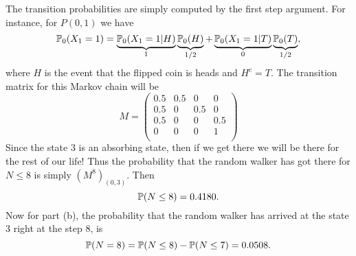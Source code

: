 \begin{example}
\begin{solution}
\begin{center}
\begin{tikzpicture}[->,>=stealth',shorten >=1pt,auto,node distance=2.1cm,
				semithick,scale=0.7]
			\end{tikzpicture}
		\end{center}
	The transition probabilities are simply computed by the first step argument. For instance, for $P(0,1)$ we have
	\[ \prob_0(X_1 = 1) = \underbrace{\prob_0(X_1 = 1|H)}_{1}\underbrace{\prob_0(H)}_{1/2} + \underbrace{\prob_0(X_1 = 1|T)}_{0}\underbrace{\prob_0(T)}_{1/2}, \]
	where $H$ is the event that the flipped coin is heads and $H^c = T$. The transition matrix for this Markov chain will be
	\[
	M = \begin{pmatrix}
		0.5 & 0.5 & 0 & 0 \\
		0.5 & 0 & 0.5 & 0 \\
		0.5 & 0 & 0 & 0.5 \\
		0 & 0 & 0 & 1 \\
	\end{pmatrix}
	\]
	Since the state $3$ is an absorbing state, then if we get there we will be there for the rest of our life! Thus the probability that the random walker has got there for $N\leq 8$ is simply $(M^8)_{(0,3)}$. Then
	\[ \prob(N\leq 8) = 0.4180. \]
	Now for part (b), the probability that the random walker has arrived at the state 3 right at the step 8, is
	\[ \prob(N = 8) = \prob(N\leq 8) - \prob(N\leq 7) = 0.0508. \]
	\end{solution}
\end{example}



